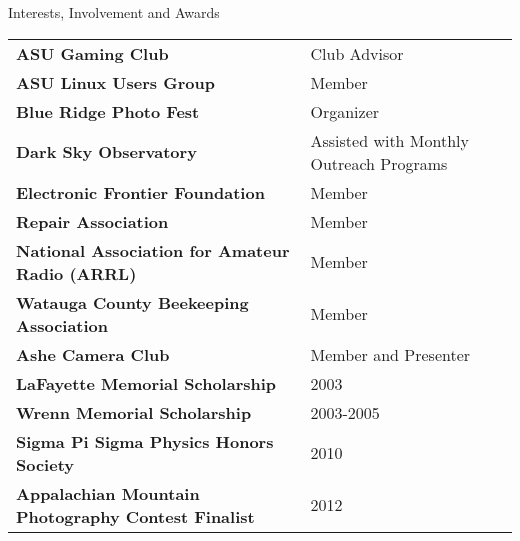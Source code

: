 \documentclass{cv} %
\begin{document}
\begin{rSection}{Interests, Involvement and Awards}

\begin{tabular}{ @{} >{\bfseries}l @{\hspace{6ex}} l }
ASU Gaming Club & Club Advisor\\
ASU Linux Users Group & Member\\
Blue Ridge Photo Fest & Organizer\\
Dark Sky Observatory & Assisted with Monthly Outreach Programs\\
Electronic Frontier Foundation & Member\\
Repair Association & Member\\
National Association for Amateur Radio (ARRL) & Member\\
Watauga County Beekeeping Association & Member \\
Ashe Camera Club & Member and Presenter\\
LaFayette Memorial Scholarship & 2003 \\
Wrenn Memorial Scholarship & 2003-2005 \\
Sigma Pi Sigma Physics Honors Society & 2010 \\
Appalachian Mountain Photography Contest Finalist & 2012 \\


\end{tabular}

\end{rSection}
\end{document}
